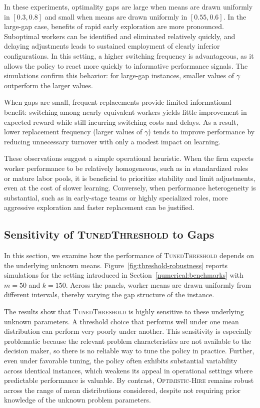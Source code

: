 \documentclass[opre,blindrev]{informs3}
\begin{document}
\begin{APPENDICES}
In these experiments, optimality gaps are large when means are drawn uniformly in \([0.3,0.8]\) and small when means are drawn uniformly in \([0.55, 0.6]\). In the large-gap case, benefits of rapid early exploration are more pronounced. Suboptimal workers can be identified and eliminated relatively quickly, and delaying adjustments leads to sustained employment of clearly inferior configurations. In this setting, a higher switching frequency is advantageous, as it allows the policy to react more quickly to informative performance signals. The simulations confirm this behavior: for large-gap instances, smaller values of \(\gamma\) outperform the larger values.

When gaps are small, frequent replacements provide limited informational benefit: switching among nearly equivalent workers yields little improvement in expected reward while still incurring switching costs and delays. As a result, lower replacement frequency (larger values of \(\gamma\)) tends to improve performance by reducing unnecessary turnover with only a modest impact on learning.

These observations suggest a simple operational heuristic. When the firm expects worker performance to be relatively homogeneous, such as in standardized roles or mature labor pools, it is beneficial to prioritize stability and limit adjustments, even at the cost of slower learning. Conversely, when performance heterogeneity is substantial, such as in early-stage teams or highly specialized roles, more aggressive exploration and faster replacement can be justified.

\subsection{Sensitivity of \textsc{TunedThreshold} to Gaps}
\label{sec:threshold-robustness}

In this section, we examine how the performance of \textsc{TunedThreshold} depends on the underlying unknown means. Figure~\ref{fig:threshold-robustness} reports simulations for the setting introduced in Section~\ref{numerical:benchmarks} with \(m=50\) and \(k=150\). Across the panels, worker means are drawn uniformly from different intervals, thereby varying the gap structure of the instance.

The results show that \textsc{TunedThreshold} is highly sensitive to these underlying unknown parameters. A threshold choice that performs well under one mean distribution can perform very poorly under another. This sensitivity is especially problematic because the relevant problem characteristics are not available to the decision maker, so there is no reliable way to tune the policy in practice. Further, even under favorable tuning, the policy often exhibits substantial variability across identical instances, which weakens its appeal in operational settings where predictable performance is valuable. By contrast, \textsc{Optimistic-Hire} remains robust across the range of mean distributions considered, despite not requiring prior knowledge of the unknown problem parameters.



\end{APPENDICES}
\end{document}
